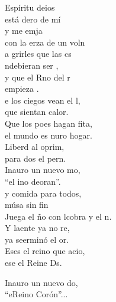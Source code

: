 \begin{cancion}%
	 Espíritu deios\\
	está dero de mí\\
	y me emja\\
	con la erza de un voln\\
	a grirles que las cs\\
	ndebieran ser ,\\
	y que el Rno del r\\
	empieza .\\
	\jump
	e los ciegos vean el l,\\
	que sientan  calor. \\
	Que los poes hagan fita,\\
	el mundo es nuro hogar.\\
	Liberd al oprim,\\
	para dos el pern.\\
	Inauro un nuevo mo,\\
	“el ino deoran”.\\
	\jump
	y comida para todos, \\
	músa sin fin \\
	Juega el ño con lcobra y el n.\\
	Y laente ya no re,\\
	ya seerminó el or.\\
	Eses el reino que acio,\\
	ese  el Reine Ds.\jump\\
	\begin{chorus}%
		Inauro un nuevo do,\\
		“eReino  Corón”...\jump\\
	\end{chorus}%
\end{cancion}%
